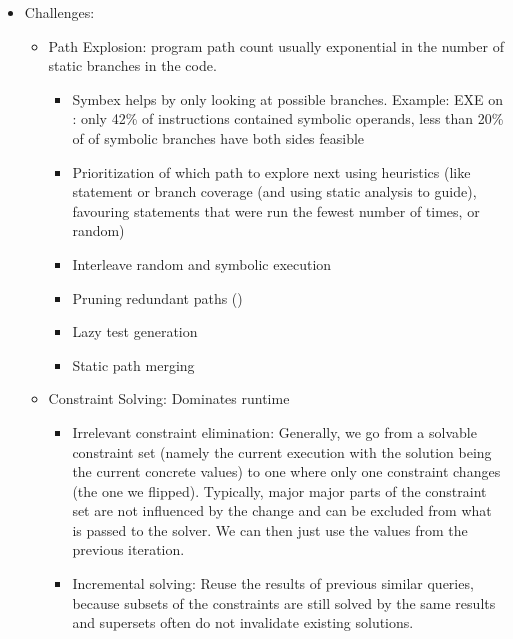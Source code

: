 \documentclass{article}
\begin{document}
\begin{itemize}
    \item Challenges:
          \begin{itemize}
              \item Path Explosion: program path count usually exponential in the number of static branches in the code.
                    \begin{itemize}
                        \item Symbex helps by only looking at possible branches. Example: EXE\cite{EXE} on : only 42\% of instructions contained symbolic operands, less than 20\% of of symbolic branches have both sides feasible\cite{EXE}
                        \item Prioritization of which path to explore next using heuristics (like statement or branch coverage (and using static analysis to guide), favouring statements that were run the fewest number of times, or random)
                        \item Interleave random and symbolic execution
                        \item Pruning redundant paths (\cite{RWset})
                        \item Lazy test generation
                        \item Static path merging
                    \end{itemize}
              \item Constraint Solving: Dominates runtime
                    \begin{itemize}
                        \item Irrelevant constraint elimination: Generally, we go from a solvable constraint set (namely the current execution with the solution being the current concrete values) to one where only one constraint changes (the one we flipped). Typically, major major parts of the constraint set are not influenced by the change and can be excluded from what is passed to the solver. We can then just use the values from the previous iteration.
                        \item Incremental solving: Reuse the results of previous similar queries, because subsets of the constraints are still solved by the same results and supersets often do not invalidate existing solutions.
                    \end{itemize}

\end{itemize}
\end{itemize}
\end{document}
